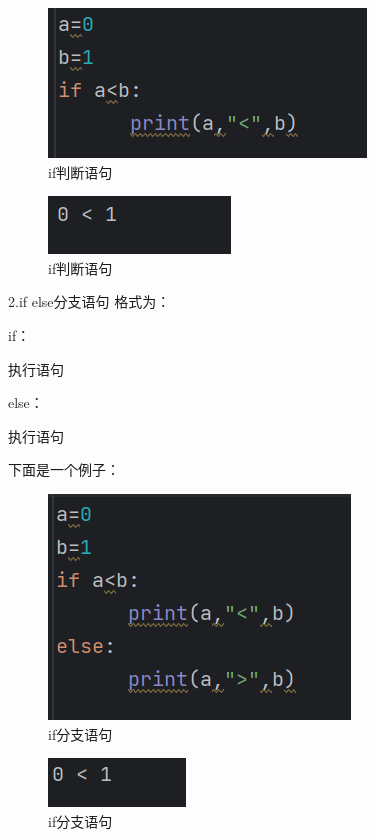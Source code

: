\documentclass{ctexart}
\begin{document}
	\begin{figure}[H]
		\centering
		\includegraphics[scale=0.5]{3.9}
		\caption{if判断语句}
	\end{figure}
	
		\begin{figure}[H]
		\centering
		\includegraphics[scale=0.5]{3.10}
		\caption{if判断语句}
	\end{figure}
	
	2.if else分支语句 格式为：
	
	if：
	
	\quad \quad 执行语句
	
	else：
	
	\quad \quad 执行语句
	
	下面是一个例子：
	\begin{figure}[H]
		\centering
		\includegraphics[scale=0.5]{3.11}
		\caption{if分支语句}
	\end{figure}
	
	\begin{figure}[H]
		\centering
		\includegraphics[scale=0.5]{3.12}
		\caption{if分支语句}
	\end{figure}
	
\end{document}
